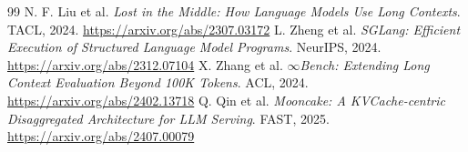 \documentclass[UTF8,10pt,a4paper,fontset=none]{ctexart}
\begin{document}
\begin{thebibliography}{99}
 N. F. Liu et al. \textit{Lost in the Middle: How Language Models Use Long Contexts}. TACL, 2024. \url{https://arxiv.org/abs/2307.03172}
 L. Zheng et al. \textit{SGLang: Efficient Execution of Structured Language Model Programs}. NeurIPS, 2024. \url{https://arxiv.org/abs/2312.07104}
 X. Zhang et al. \textit{$\infty$Bench: Extending Long Context Evaluation Beyond 100K Tokens}. ACL, 2024. \url{https://arxiv.org/abs/2402.13718}
 Q. Qin et al. \textit{Mooncake: A KVCache-centric Disaggregated Architecture for LLM Serving}. FAST, 2025. \url{https://arxiv.org/abs/2407.00079}
\end{thebibliography}
\end{document}
